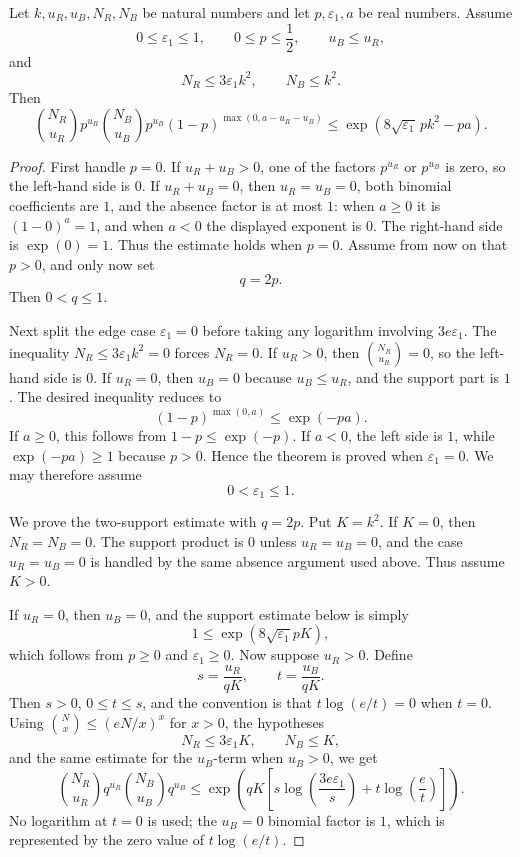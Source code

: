 \begin{helper}
Let \(k,u_R,u_B,N_R,N_B\) be natural numbers and let \(p,\varepsilon_1,a\) be
real numbers.  Assume
\[
0\le\varepsilon_1\le1,\qquad 0\le p\le\frac12,\qquad
u_B\le u_R,
\]
and
\[
N_R\le 3\varepsilon_1k^2,\qquad N_B\le k^2.
\]
Then
\[
\binom{N_R}{u_R}p^{u_R}
\binom{N_B}{u_B}p^{u_B}
(1-p)^{\max(0,a-u_R-u_B)}
\le
\exp\!\left(8\sqrt{\varepsilon_1}\,pk^2-pa\right).
\]
\end{helper}
\begin{proof}
First handle \(p=0\).  If \(u_R+u_B>0\), one of the factors \(p^{u_R}\) or
\(p^{u_B}\) is zero, so the left-hand side is \(0\).  If
\(u_R+u_B=0\), then \(u_R=u_B=0\), both binomial coefficients are \(1\), and
the absence factor is at most \(1\): when \(a\ge0\) it is
\((1-0)^a=1\), and when \(a<0\) the displayed exponent is \(0\).  The
right-hand side is \(\exp(0)=1\).  Thus the estimate holds when \(p=0\).
Assume from now on that \(p>0\), and only now set
\[
q=2p.
\]
Then \(0<q\le1\).

Next split the edge case \(\varepsilon_1=0\) before taking any logarithm
involving \(3e\varepsilon_1\).  The inequality
\(N_R\le3\varepsilon_1k^2=0\) forces \(N_R=0\).  If \(u_R>0\), then
\(\binom{N_R}{u_R}=0\), so the left-hand side is \(0\).  If \(u_R=0\), then
\(u_B=0\) because \(u_B\le u_R\), and the support part is \(1\).  The desired
inequality reduces to
\[
(1-p)^{\max(0,a)}\le \exp(-pa).
\]
If \(a\ge0\), this follows from \(1-p\le\exp(-p)\).  If \(a<0\), the left
side is \(1\), while \(\exp(-pa)\ge1\) because \(p>0\).  Hence the theorem is
proved when \(\varepsilon_1=0\).  We may therefore assume
\[
0<\varepsilon_1\le1. \tag{1}
\]

We prove the two-support estimate with \(q=2p\).  Put \(K=k^2\).  If
\(K=0\), then \(N_R=N_B=0\).  The support product is \(0\) unless
\(u_R=u_B=0\), and the case \(u_R=u_B=0\) is handled by the same absence
argument used above.  Thus assume \(K>0\).

If \(u_R=0\), then \(u_B=0\), and the support estimate below is simply
\[
1\le \exp(8\sqrt{\varepsilon_1}pK),
\]
which follows from \(p\ge0\) and \(\varepsilon_1\ge0\).  Now suppose
\(u_R>0\).  Define
\[
s=\frac{u_R}{qK},\qquad t=\frac{u_B}{qK}.
\]
Then \(s>0\), \(0\le t\le s\), and the convention is that
\(t\log(e/t)=0\) when \(t=0\).  Using
\(\binom Nx\le(eN/x)^x\) for \(x>0\), the hypotheses
\[
N_R\le3\varepsilon_1K,\qquad N_B\le K,
\]
and the same estimate for the \(u_B\)-term when \(u_B>0\), we get
\[
\binom{N_R}{u_R}q^{u_R}
\binom{N_B}{u_B}q^{u_B}
\le
\exp\!\left(qK\left[
s\log\!\left(\frac{3e\varepsilon_1}{s}\right)
+t\log\!\left(\frac e t\right)\right]\right). \tag{2}
\]
No logarithm at \(t=0\) is used; the \(u_B=0\) binomial factor is \(1\), which
is represented by the zero value of \(t\log(e/t)\).


\end{proof}
